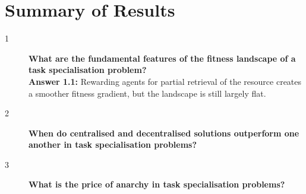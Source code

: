 \documentclass[12pt]{article}
\begin{document}
\appendix

\section{Summary of Results}

\begin{description}
\item[1] \textbf{What are the fundamental features of the fitness landscape of a task specialisation problem?}\\

\textbf{Answer 1.1:} Rewarding agents for partial retrieval of the resource creates a smoother fitness gradient, but the landscape is still largely flat.\\

\item[2] \textbf{When do centralised and decentralised solutions outperform one another in task specialisation problems?}\\



\item[3] \textbf{What is the price of anarchy in task specialisation problems?}\\



\end{description}
\end{document}
